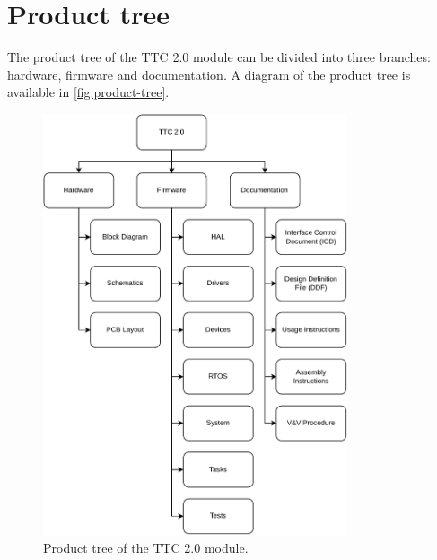 \section{Product tree}

The product tree of the TTC 2.0 module can be divided into three branches: hardware, firmware and documentation. A diagram of the product tree is available in \autoref{fig:product-tree}.

\begin{figure}[!ht]
    \begin{center}
        \includegraphics[width=0.8\textwidth]{figures/product-tree.pdf}
        \caption{Product tree of the TTC 2.0 module.}
        \label{fig:product-tree}
    \end{center}
\end{figure}

